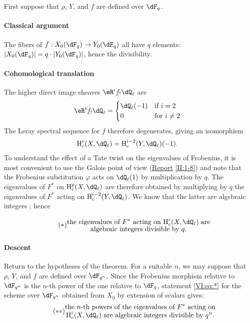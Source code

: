 First suppose that $\rho$, $Y$, and $f$ are defined over $\dF_q$. 


\paragraph{Classical argument}
The fibers of $f:X_0(\dF_q)\to Y_0(\dF_q)$ all have $q$ elements: 
$|X_0(\dF_q)| = q\cdot |Y_0(\dF_q)|$, hence the divisibility. 


\paragraph{Cohomological translation}
The higher direct image sheaves $\eR^i f_!\dQ_\ell$ are 
\[
  \eR^i f_!\dQ_\ell = \begin{cases}
                       \dQ_\ell(-1) & \text{if $i = 2$} \\
                       0            & \text{for $i\ne 2$}
                     \end{cases}
\]
The Leray spectral sequence for $f$ therefore degenerates, giving an isomorphism 
\[
  \h_c^i(X,\dQ_\ell) = \h_c^{i-2}(Y,\dQ_\ell)(-1) \text{.}
\]
To understand the effect of a Tate twist on the eigenvalues of 
Frobenius, it is most convenient to use the Galois point of view 
(\hyperref[II]{Report} \ref{II:1-8}) and note that the Frobenius substitution 
$\varphi$ acts on $\dQ_\ell(1)$ by multiplication by $q$. The 
eigenvalues of $F^\ast$ on $\h_c^p(X,\dQ_\ell)$ are therefore obtained by 
multiplying by $q$ the eigenvalues of $F^\ast$ acting on $\h_c^{i-2}(Y,\dQ_\ell)$. We 
know that the latter are algebraic integers \cite[XXI 5.2.2]{sga7}; hence 

\begin{equation*}\tag{$*$}\label{VI:eq:*}
  \substack{\displaystyle\text{the eigenvalues of $F^\ast$ acting on $\h_c^i(X,\dQ_\ell)$ are} \\
  \displaystyle\text{algebraic integers divisible by $q$.}}
\end{equation*}


\paragraph{Descent}
Return to the hypotheses of the theorem. For a suitable $n$, we may 
suppose that $\rho$, $Y$, and $f$ are defined over $\dF_{q^n}$. Since the 
Frobenius morphism relative to $\dF_{q^n}$ is the $n$-th power of the one 
relative to $\dF_q$, statement \eqref{VI:eq:*} for the scheme over 
$\dF_{q^n}$ obtained from $X_0$ by extension of scalars gives: 
\begin{equation*}\tag{$**$}\label{VI:eq:**}
  \substack{\displaystyle\text{the $n$-th powers of the eigenvalues of $F^\ast$ acting on} \\ \displaystyle\text{$\h_c^i(X,\dQ_\ell)$ are algebraic integers divisible by $q^n$.}}
\end{equation*}


